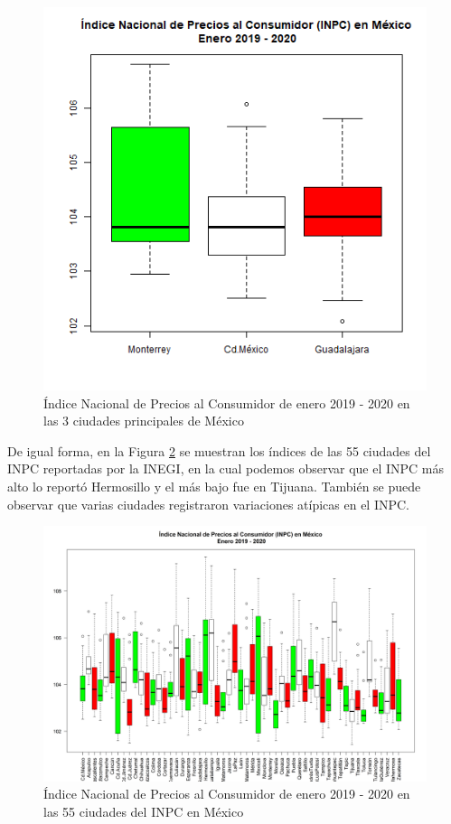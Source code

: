 \documentclass[fontsize=12pt]{article}
\begin{document}
\begin{figure}[htp]
\centering
\includegraphics[scale=0.8]{PrincipalesCiudades}
\caption{Índice Nacional de Precios al Consumidor de enero 2019 - 2020 en las 3 ciudades principales de México}
\label{PrincipalesCiudades}
\end{figure}

De igual forma, en la Figura \ref{TotalCiudades} se muestran los índices de las 55 ciudades del INPC reportadas por la INEGI, en la cual podemos observar que el INPC más alto lo reportó Hermosillo y el más bajo fue en Tijuana. También se puede observar que varias ciudades registraron variaciones atípicas en el INPC.

\begin{figure}[h]
\centering
\includegraphics[scale=0.55]{TotalCiudades}
\caption{Índice Nacional de Precios al Consumidor de enero 2019 - 2020 en las 55 ciudades del INPC en México}
\label{TotalCiudades}
\end{figure}




	
	
	
	
\end{document}
